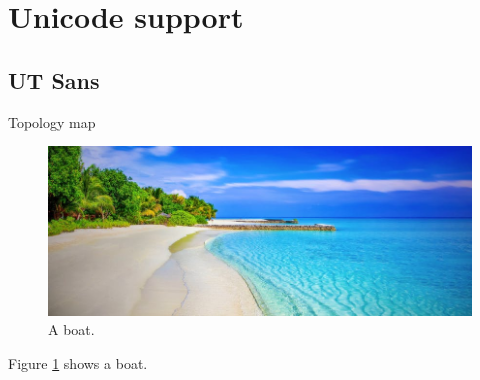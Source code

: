 \documentclass[12pt]{article}
\begin{document}
\setmainfont[Ligatures=TeX]{UTSans-Regular}
\section{Unicode support}

\subsection{UT Sans}

Topology map

\begin{figure}
    \includegraphics[width=\linewidth]{imagini/beach.jpeg}
    \caption{A boat.}
    \label{fig:boat1}
  \end{figure}

Figure \ref{fig:boat1} shows a boat.


\end{document}
